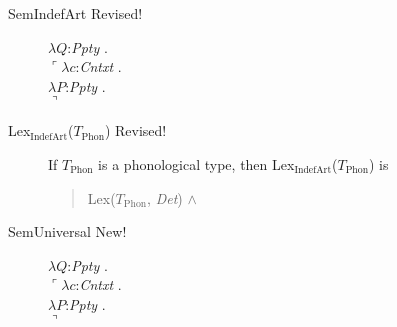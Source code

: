\begin{description}
  
\item[\textnormal{SemIndefArt} Revised!] \mbox{}


  $\lambda Q$:\textit{Ppty} . \\
  \hspace*{1em}$\ulcorner\lambda c$:\textit{Cntxt} . \\
  \hspace*{2em}$\lambda P$:\textit{Ppty} . \\
  \hspace*{3em}$\urcorner$

        
      \item[\textnormal{Lex$_{\mathrm{IndefArt}}$($T_{\mathrm{Phon}}$)}
        Revised!]
        \mbox{}

        If $T_{\mathrm{Phon}}$ is a phonological type, then
        Lex$_{\mathrm{IndefArt}}$($T_{\mathrm{Phon}}$) is
        \begin{quote}
          Lex($T_{\mathrm{Phon}}$, \textit{Det}) \d{$\wedge$}
        \end{quote}

        
      \item[\textnormal{SemUniversal} New!] \mbox{}

        $\lambda Q$:\textit{Ppty} . \\
  \hspace*{1em}$\ulcorner\lambda c$:\textit{Cntxt} . \\
  \hspace*{2em}$\lambda P$:\textit{Ppty} . \\
  \hspace*{3em}$\urcorner$


\end{description}
